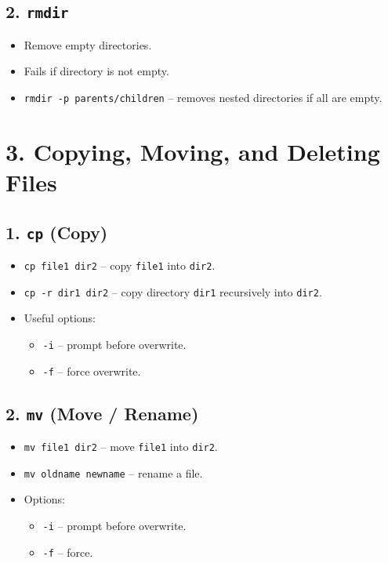 \documentclass[a4paper]{report}
\begin{document}
\subsection*{2. \texttt{rmdir}}
\begin{itemize}
    \item Remove empty directories.
    \item Fails if directory is not empty.
    \item \texttt{rmdir -p parents/children} -- removes nested directories if all are empty.
\end{itemize}

\section*{3. Copying, Moving, and Deleting Files}
\subsection*{1. \texttt{cp} (Copy)}
\begin{itemize}
    \item \texttt{cp file1 dir2} -- copy \texttt{file1} into \texttt{dir2}.
    \item \texttt{cp -r dir1 dir2} -- copy directory \texttt{dir1} recursively into \texttt{dir2}.
    \item Useful options:
    \begin{itemize}
        \item \texttt{-i} -- prompt before overwrite.
        \item \texttt{-f} -- force overwrite.
    \end{itemize}
\end{itemize}

\subsection*{2. \texttt{mv} (Move / Rename)}
\begin{itemize}
    \item \texttt{mv file1 dir2} -- move \texttt{file1} into \texttt{dir2}.
    \item \texttt{mv oldname newname} -- rename a file.
    \item Options:
    \begin{itemize}
        \item \texttt{-i} -- prompt before overwrite.
        \item \texttt{-f} -- force.
    \end{itemize}
\end{itemize}
\end{document}

